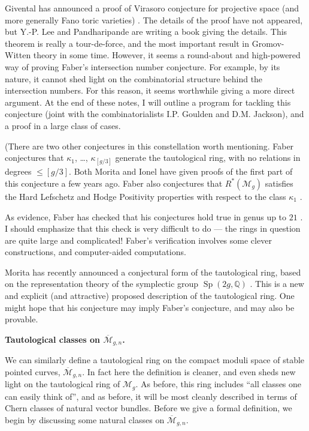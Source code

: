 \documentclass[12pt,letterpaper]{amsart}
\newcommand{\bpoint}[1]{\vspace{3mm}\par \noindent \refstepcounter{subsection}{\bf \thesubsection.} 
  {\bf #1.} }
\newcommand{\Q}{\mathbb{Q}}
\newcommand{\ka}{\kappa}
\newcommand{\cm}{{\mathcal{M}}}
\newcommand{\cmbar}{\overline{\cm}}
\newcommand{\lremind}[1]{{\bf[label:  #1]}}
\renewcommand{\lremind}[1]{{}}
\begin{document}
{Givental has announced a proof of Virasoro conjecture for projective space
(and more generally Fano toric varieties)
\cite{givental}.  The details of the proof have not appeared, but
Y.-P. Lee and Pandharipande are writing a book \cite{lp} giving the
details.  This theorem is really a tour-de-force, and the most
important result in Gromov-Witten theory in some time.
However, it seems  a round-about and high-powered way of proving
Faber's intersection number conjecture.  For example, by its nature, it
cannot shed light on the combinatorial structure behind the intersection
numbers.  For this reason, it seems worthwhile giving a more direct
argument.  At the end of these notes, I will outline a program
for tackling this conjecture (joint with the combinatorialists
I.P. Goulden and D.M. Jackson), and a proof in a large class of cases.

(There are two other conjectures in this constellation worth
mentioning.  Faber conjectures that $\ka_1$, \dots, $\ka_{[g/3]}$
generate the tautological ring, with no relations in degrees $\leq
[g/3]$.  Both Morita \cite{morita1} and Ionel \cite{i} have given
proofs of the first part of this conjecture a few years ago.
Faber also conjectures that 
$R^*(\cm_g)$ satisfies the Hard Lefschetz and Hodge Positivity  properties 
with respect to the
class $\ka_1$ \cite[Conj.~ 1(bis)]{faber}.


As evidence, Faber has checked that his conjectures hold true in genus
up to $21$ \cite{faberpc}. I should emphasize that this check is very
difficult to do --- the rings in question are quite large and
complicated!  Faber's verification involves some clever constructions,
and computer-aided computations.

Morita has recently announced a conjectural form of the tautological
ring, based on the representation theory of the symplectic group
$\operatorname{Sp}(2g,\Q)$ \cite[Conj.~1]{morita2}.  This is a new and
explicit (and attractive) proposed description of the tautological
ring.  One might hope that his conjecture may imply Faber's
conjecture, and may also be provable.

\bpoint{Tautological classes on $\cmbar_{g,n}$} \label{taut2}\lremind{taut2}

We can similarly define a tautological ring on the compact moduli
space of stable pointed curves, $\cmbar_{g,n}$.  In fact here the
definition is cleaner, and even sheds new light on the tautological ring of
$\cm_g$.  As before, this ring includes ``all classes one can easily
think of'', and as before, it will be most cleanly described in terms
of Chern classes of natural vector bundles.  Before we give a formal
definition, we begin by discussing some natural classes on
$\cmbar_{g,n}$.

}
\end{document}
